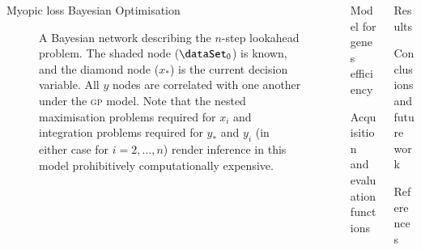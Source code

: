 \documentclass[15pt,serif,mathserif,final]{beamer}
\newcommand{\xst}{x_{\ast}}
\newcommand{\acr}[1]{\textsc{#1}\xspace}
\newcommand{\gp}{\acr{gp}}
\begin{document}
\begin{frame}{}
\begin{columns}[t]
\begin{column}{0.32\linewidth}
\begin{block}{Myopic loss Bayesian Optimisation}
\begin{figure}[t!]
\caption{
    A Bayesian network describing the $n$-step lookahead problem. The shaded node ($\dataSet_0$) is known, and the diamond node ($\xst$) is the current decision variable. All $y$ nodes are correlated with one another under the \gp model. Note that the nested maximisation problems required for $x_i$ and integration problems required for $y_*$ and $y_i$ (in either case for $i=2,\ldots, n$) render inference in this model prohibitively computationally expensive.
}
\end{figure}

\end{block}
\end{column}%

\begin{column}{0.32\linewidth}



\begin{block}{Model for genes efficiency}
\end{block}

\begin{block}{Acquisition and evaluation functions}
\end{block}

\end{column}%



\begin{column}{0.32\linewidth}

\begin{block}{Results}
\end{block}



\begin{block}{Conclusions and future work}
\end{block}

\begin{block}{References}

\end{block}

\end{column}%
\end{columns}
\end{frame}
\end{document}

